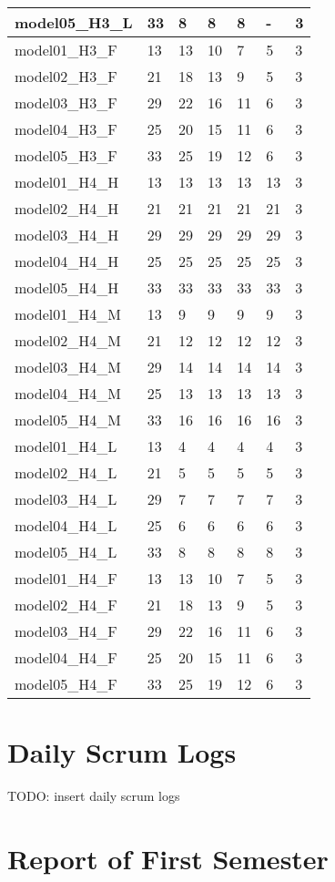 \begin{longtable}{|l|l|l|l|l|l|l|}
model05\_H3\_L & 33 & 8 & 8 & 8 & - & 3 \\ \hline
model01\_H3\_F & 13 & 13 & 10 & 7 & 5 & 3 \\ \hline
model02\_H3\_F & 21 & 18 & 13 & 9 & 5 & 3 \\ \hline
model03\_H3\_F & 29 & 22 & 16 & 11 & 6 & 3 \\ \hline
model04\_H3\_F & 25 & 20 & 15 & 11 & 6 & 3 \\ \hline
model05\_H3\_F & 33 & 25 & 19 & 12 & 6 & 3 \\ \hline
model01\_H4\_H & 13 & 13 & 13 & 13 & 13 & 3 \\ \hline
model02\_H4\_H & 21 & 21 & 21 & 21 & 21 & 3 \\ \hline
model03\_H4\_H & 29 & 29 & 29 & 29 & 29 & 3 \\ \hline
model04\_H4\_H & 25 & 25 & 25 & 25 & 25 & 3 \\ \hline
model05\_H4\_H & 33 & 33 & 33 & 33 & 33 & 3 \\ \hline
model01\_H4\_M & 13 & 9 & 9 & 9 & 9 & 3 \\ \hline
model02\_H4\_M & 21 & 12 & 12 & 12 & 12 & 3 \\ \hline
model03\_H4\_M & 29 & 14 & 14 & 14 & 14 & 3 \\ \hline
model04\_H4\_M & 25 & 13 & 13 & 13 & 13 & 3 \\ \hline
model05\_H4\_M & 33 & 16 & 16 & 16 & 16 & 3 \\ \hline
model01\_H4\_L & 13 & 4 & 4 & 4 & 4 & 3 \\ \hline
model02\_H4\_L & 21 & 5 & 5 & 5 & 5 & 3 \\ \hline
model03\_H4\_L & 29 & 7 & 7 & 7 & 7 & 3 \\ \hline
model04\_H4\_L & 25 & 6 & 6 & 6 & 6 & 3 \\ \hline
model05\_H4\_L & 33 & 8 & 8 & 8 & 8 & 3 \\ \hline
model01\_H4\_F & 13 & 13 & 10 & 7 & 5 & 3 \\ \hline
model02\_H4\_F & 21 & 18 & 13 & 9 & 5 & 3 \\ \hline
model03\_H4\_F & 29 & 22 & 16 & 11 & 6 & 3 \\ \hline
model04\_H4\_F & 25 & 20 & 15 & 11 & 6 & 3 \\ \hline
model05\_H4\_F & 33 & 25 & 19 & 12 & 6 & 3 \\ \hline
\end{longtable}

\newpage
\section{Daily Scrum Logs}
\label{section:appendix_b}
TODO: insert daily scrum logs











\newpage
\section{ Report of First Semester}
\label{section:appendix_c}
\newpage

